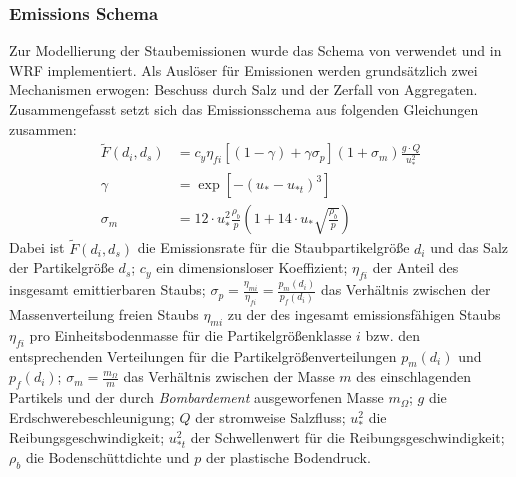 \documentclass[12pt,a4paper,onecolumn,draft]{scrartcl}
\begin{document}
\subsubsection{Emissions Schema}
Zur Modellierung der Staubemissionen wurde das Schema von \citet{Shao.2004} verwendet und in WRF implementiert. Als Auslöser für Emissionen werden grundsätzlich zwei Mechanismen erwogen: Beschuss durch Salz und der Zerfall von Aggregaten. Zusammengefasst setzt sich das Emissionsschema \citep{Shao.2004} aus folgenden Gleichungen zusammen:
\begin{align}
\tilde{F} (d_i,d_s) &= c_y \eta_{fi} \left[\left(1-\gamma\right) + \gamma
\sigma_p \right] \left(1+\sigma_m \right) \frac{g \cdot Q}{u^2_*} \\
\gamma &= \exp \left[-\left(u_* - u_{*t} \right)^3\right] \\
\sigma_m &= 12 \cdot u_*^2 \frac{\rho_b}{p} \left(1 +14 \cdot u_* \sqrt{\frac{\rho_b}{p}} \right)
\end{align}
Dabei ist $\tilde{F}(d_i,d_s)$ die Emissionsrate für die Staubpartikelgröße $d_i$ und das Salz der Partikelgröße $d_s$; $c_y$ ein dimensionsloser Koeffizient; $\eta_{fi}$ der Anteil des insgesamt emittierbaren Staubs; $\sigma_p = \frac{\eta_{mi}}{\eta_{fi}} = \frac{p_{m}(d_i)}{p_{f}(d_i)}$ das Verhältnis zwischen der Massenverteilung freien Staubs $\eta_{mi}$ zu der des ingesamt emissionsfähigen Staubs $\eta_{fi}$ pro Einheitsbodenmasse für die Partikelgrößenklasse $i$ bzw. den entsprechenden Verteilungen für die Partikelgrößenverteilungen $p_{m}(d_i)$ und $p_{f}(d_i)$;  $\sigma_m= \frac{m_\Omega}{m}$ das Verhältnis zwischen der Masse  $m$ des einschlagenden Partikels und der durch \textit{Bombardement} ausgeworfenen Masse $m_\Omega$; $g$ die Erdschwerebeschleunigung; $Q$ der stromweise Salzfluss; $u_*^2$ die Reibungsgeschwindigkeit; $u_{*t}^2$ der Schwellenwert für die Reibungsgeschwindigkeit; $\rho_b$ die Bodenschüttdichte und $p$ der plastische Bodendruck.
\end{document}
